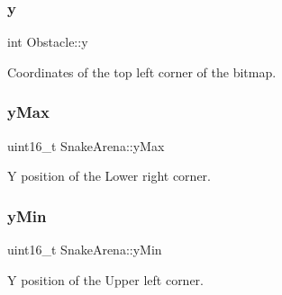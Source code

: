 \subsubsection{\texorpdfstring{y}{y}\hspace{0.1cm}{\footnotesize\ttfamily [3/3]}}
{\footnotesize\ttfamily int Obstacle\+::y}



Coordinates of the top left corner of the bitmap. 

\mbox{\label{group__snake_ga46349d738f8a96533df9e57ece666fbc}} 
\subsubsection{\texorpdfstring{y\+Max}{yMax}}
{\footnotesize\ttfamily uint16\+\_\+t Snake\+Arena\+::y\+Max}



Y position of the Lower right corner. 

\mbox{\label{group__snake_ga7e608098f74d891fb16367603bd4db33}} 
\subsubsection{\texorpdfstring{y\+Min}{yMin}}
{\footnotesize\ttfamily uint16\+\_\+t Snake\+Arena\+::y\+Min}



Y position of the Upper left corner. 

